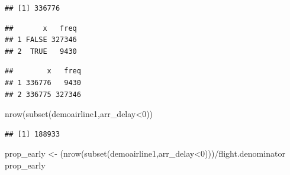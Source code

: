 \documentclass[
]{article}
\newenvironment{Shaded}{\begin{snugshade}}{\end{snugshade}}
\newcommand{\DecValTok}[1]{\textcolor[rgb]{0.00,0.00,0.81}{#1}}
\newcommand{\FunctionTok}[1]{\textcolor[rgb]{0.00,0.00,0.00}{#1}}
\newcommand{\NormalTok}[1]{#1}
\newcommand{\OtherTok}[1]{\textcolor[rgb]{0.56,0.35,0.01}{#1}}
\newcommand{\SpecialCharTok}[1]{\textcolor[rgb]{0.00,0.00,0.00}{#1}}
\begin{document}
\begin{verbatim}
## [1] 336776
\end{verbatim}

\begin{Shaded}
\end{Shaded}

\begin{verbatim}
##       x   freq
## 1 FALSE 327346
## 2  TRUE   9430
\end{verbatim}

\begin{Shaded}
\end{Shaded}

\begin{verbatim}
##        x   freq
## 1 336776   9430
## 2 336775 327346
\end{verbatim}

\begin{Shaded}
\begin{Highlighting}[]
\FunctionTok{nrow}\NormalTok{(}\FunctionTok{subset}\NormalTok{(demoairline1,arr\_delay}\SpecialCharTok{\textless{}}\DecValTok{0}\NormalTok{))}
\end{Highlighting}
\end{Shaded}

\begin{verbatim}
## [1] 188933
\end{verbatim}

\begin{Shaded}
\begin{Highlighting}[]
\NormalTok{prop\_early }\OtherTok{\textless{}{-}}\NormalTok{ (}\FunctionTok{nrow}\NormalTok{(}\FunctionTok{subset}\NormalTok{(demoairline1,arr\_delay}\SpecialCharTok{\textless{}}\DecValTok{0}\NormalTok{)))}\SpecialCharTok{/}\NormalTok{flight.denominator}
\NormalTok{prop\_early}
\end{Highlighting}
\end{Shaded}
\end{document}
